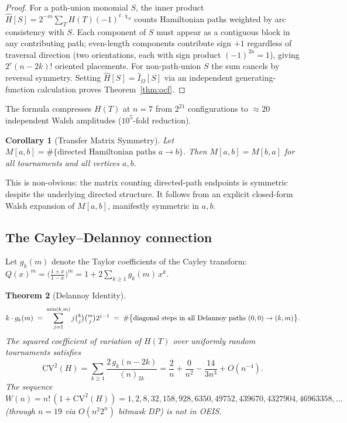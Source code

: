 \documentclass[11pt,reqno]{amsart}
\theoremstyle{plain}
\newtheorem{thm}{Theorem}[section]
\newtheorem{cor}[thm]{Corollary}
\theoremstyle{definition}
\theoremstyle{remark}
\newcommand{\CV}{\mathrm{CV}}
\begin{document}
\begin{proof}[Proof]
For a path-union monomial $S$, the inner product $\hat H[S]=2^{-m}\sum_T
H(T)(-1)^{t\cdot\chi_S}$ counts Hamiltonian paths weighted by arc consistency
with $S$.  Each component of $S$ must appear as a contiguous block in any
contributing path; even-length components contribute sign $+1$ regardless of
traversal direction (two orientations, each with sign product $(-1)^{2a}=1$),
giving $2^r(n-2k)!$ oriented placements.  For non-path-union $S$ the sum
cancels by reversal symmetry.  Setting $\hat H[S]=\hat I_\Omega[S]$ via an
independent generating-function calculation proves Theorem~\ref{thm:ocf}.
\end{proof}

The formula compresses $H(T)$ at $n=7$ from $2^{21}$ configurations to
$\approx 20$ independent Walsh amplitudes ($10^5$-fold reduction).

\begin{cor}[Transfer Matrix Symmetry]\label{cor:transfer}
Let $M[a,b]=\#\{\text{directed Hamiltonian paths }a\to b\}$.
Then $M[a,b]=M[b,a]$ for all tournaments and all vertices $a,b$.
\end{cor}

This is non-obvious: the matrix counting directed-path endpoints is symmetric
despite the underlying directed structure.  It follows from an explicit
closed-form Walsh expansion of $M[a,b]$, manifestly symmetric in $a,b$.

\subsection*{The Cayley--Delannoy connection}

Let $g_k(m)$ denote the Taylor coefficients of the Cayley transform:
$Q(x)^m=\bigl(\frac{1+x}{1-x}\bigr)^m=1+2\sum_{k\ge 1}g_k(m)\,x^k$.

\begin{thm}[Delannoy Identity]\label{thm:delannoy}
\[
k\cdot g_k(m) \;=\;
\sum_{j=1}^{\min(k,m)} j\tbinom{k}{j}\tbinom{m}{j}2^{j-1}
\;=\; \#\bigl\{\text{diagonal steps in all Delannoy paths }(0,0)\to(k,m)\bigr\}.
\]
The squared coefficient of variation of $H(T)$ over uniformly random
tournaments satisfies
\[
\CV^2(H)=\sum_{k\ge 1}\frac{2\,g_k(n-2k)}{(n)_{2k}}
=\frac{2}{n}+\frac{0}{n^2}-\frac{14}{3n^3}+O(n^{-4}).
\]
The sequence $W(n)=n!\,(1+\CV^2(H))=1,2,8,32,158,928,6350,49752,439670,
4327904,46963358,\ldots$ (through $n{=}19$ via $O(n^2{2^n})$ bitmask DP)
is not in OEIS.
\end{thm}
\end{document}
